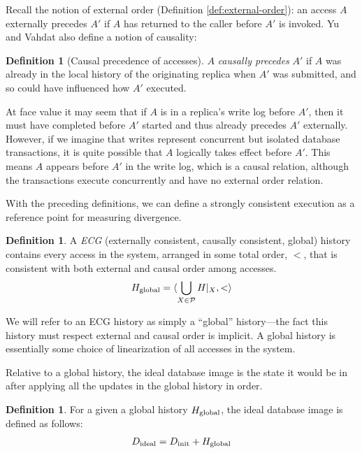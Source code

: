\documentclass[]             %
{NASA}                       %
\theoremstyle{definition}
\newtheorem{definition}[theorem]{Definition}
\begin{document}
Recall the notion of external order (Definition
\ref{def:external-order}): an access $A$ externally precedes $A'$ if
$A$ has returned to the caller before $A'$ is invoked. Yu and Vahdat
also define a notion of causality:
\begin{definition}[Causal precedence of accesses]
  \label{def:conit-causal-precedence}
  $A$ \emph{causally precedes} $A'$ if $A$ was already in the local
  history of the originating replica when $A'$ was submitted, and so
  could have influenced how $A'$ executed.
\end{definition}
At face value it may seem that if $A$ is in a replica's write log
before $A'$, then it must have completed before $A'$ started and thus
already precedes $A'$ externally. However, if we imagine that writes
represent concurrent but isolated database transactions, it is quite
possible that $A$ logically takes effect before $A'$. This means $A$
appears before $A'$ in the write log, which is a causal relation,
although the transactions execute concurrently and have no external
order relation.

With the preceding definitions, we can define a strongly consistent
execution as a reference point for measuring divergence.
\begin{definition}
  A \emph{ECG} (externally consistent, causally consistent, global)
  history contains every access in the system, arranged in some total
  order, $<$, that is consistent with both external and causal order
  among accesses.
  \begin{equation}
    H_\mathrm{global} = \langle \bigcup_{X \in \mathcal{P}} H|_{X}, < \rangle
  \end{equation}
\end{definition}
We will refer to an ECG history as simply a ``global'' history---the
fact this history must respect external and causal order is implicit.
A global history is essentially some choice of linearization of all
accesses in the system.

Relative to a global history, the ideal database image is the state it
would be in after applying all the updates in the global history in
order.
\begin{definition}
  For a given a global history $H_\mathrm{global}$, the ideal database image is
  defined as follows:
  \begin{gather}
    D_{\textrm{ideal}} = D_\textrm{init} + H_\mathrm{global} \label{eq:conit-D-ideal}
  \end{gather}
\end{definition}
\end{document}
